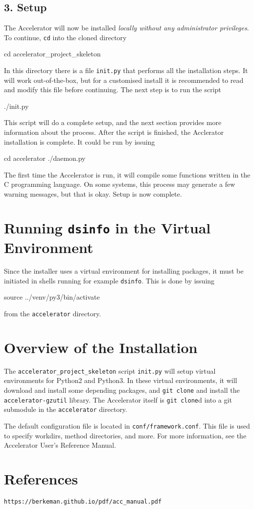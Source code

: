 \documentclass[a4paper]{article}
\begin{document}
\subsection*{3. Setup}
The Accelerator will now be installed \textsl{locally without any
administrator privileges}.  To continue, \texttt{cd} into the cloned
directory
\begin{shell}
cd accelerator_project_skeleton
\end{shell}
In this directory there is a file \texttt{init.py} that performs all
the installation steps.  It will work out-of-the-box, but for a
customised install it is recommended to read and modify this file
before continuing.  The next step is to run the script
\begin{shell}
./init.py
\end{shell}
This script will do a complete setup, and the next section provides
more information about the process.  After the script is finished, the
Acclerator installation is complete.  It could be run by issuing
\begin{shell}
cd accelerator
./daemon.py  
\end{shell}
The first time the Accelerator is run, it will compile some functions
written in the C programming language.  On some systems, this process
may generate a few warning messages, but that is okay.  Setup is now
complete.  \thispagestyle{empty}

\section{Running \texttt{dsinfo} in the Virtual Environment}
Since the installer uses a virtual environment for installing
packages, it must be initiated in shells running for example
\texttt{dsinfo}.  This is done by issuing
\begin{shell}
source ../venv/py3/bin/activate
\end{shell}
from the \texttt{accelerator} directory.


\section*{Overview of the Installation}
The \texttt{accelerator\_project\_skeleton} script \texttt{init.py}
will setup virtual environments for Python2 and Python3.  In these
virtual environments, it will download and install some depending
packages, and \texttt{git clone} and install the
\texttt{accelerator-gzutil} library.  The Accelerator itself is
\texttt{git clone}d into a git submodule in the \texttt{accelerator}
directory.

The default configuration file is located in
\texttt{conf/framework.conf}.  This file is used to specify workdirs,
method directories, and more.  For more information, see the
Accelerator User's Reference Manual.



\section*{References}
\texttt{https://berkeman.github.io/pdf/acc\_manual.pdf}
\end{document}
